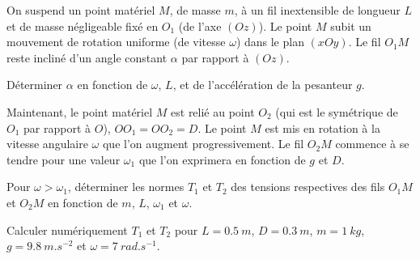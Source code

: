 \begin{exercice}
  On suspend un point matériel $M$, de masse $m$, à un fil inextensible de longueur $L$ et de masse négligeable fixé en $O_1$ (de l'axe $(Oz)$). Le point $M$ subit un mouvement de rotation uniforme (de vitesse $\omega$)  dans le plan $(xOy)$. Le fil $O_1M$ reste incliné d'un angle constant $\alpha$ par rapport à $(Oz)$. 

  Déterminer $\alpha$ en fonction de $\omega$, $L$, et de l'accélération de la pesanteur $g$.

Maintenant, le point matériel $M$ est relié au point $O_2$ (qui est le symétrique de $O_1$ par rapport à $O$), $OO_1=OO_2=D$. Le point $M$ est mis en rotation à la vitesse angulaire $\omega$ que l'on augment progressivement. Le fil $O_2M$ commence à se tendre pour une valeur $\omega_1$ que l'on exprimera en fonction de $g$ et $D$.

Pour $\omega > \omega_1$, déterminer les normes $T_1$ et $T_2$ des tensions respectives des fils $O_1M$ et $O_2M$ en fonction de $m$, $L$, $\omega_1$ et $\omega$.

Calculer numériquement $T_1$ et $T_2$ pour $L=\SI{0.5}{m}$, $D=\SI{0.3}{m}$, $m=\SI{1}{kg}$, $g=\SI{9.8}{m.s^{-2}}$ et $\omega=\SI{7}{rad.s^{-1}}$.
\end{exercice}